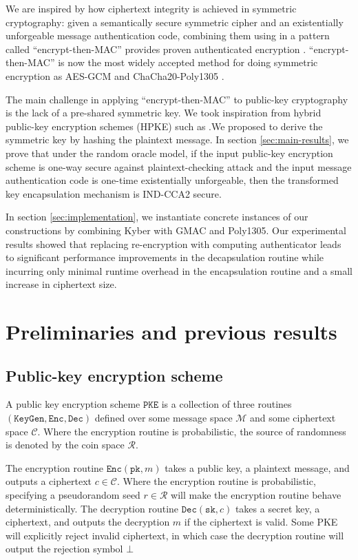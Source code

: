 \documentclass[journal=tches,submission]{iacrtrans}
\newcommand{\pke}{\texttt{PKE}}
\newcommand{\keygen}{\texttt{KeyGen}}
\newcommand{\encrypt}{\texttt{Enc}}
\newcommand{\decrypt}{\texttt{Dec}}
\newcommand{\pk}{\texttt{pk}}
\newcommand{\sk}{\texttt{sk}}
\begin{document}
We are inspired by how ciphertext integrity is achieved in symmetric cryptography: given a semantically secure symmetric cipher and an existentially unforgeable message authentication code, combining them using in a pattern called ``encrypt-then-MAC'' provides proven authenticated encryption \cite{bellare2000authenticated}. ``encrypt-then-MAC'' is now the most widely accepted method for doing symmetric encryption as AES-GCM \cite{mcgrew2004galois} and ChaCha20-Poly1305 \cite{nir2018chacha20}.

The main challenge in applying ``encrypt-then-MAC'' to public-key cryptography is the lack of a pre-shared symmetric key. We took inspiration from hybrid public-key encryption schemes (HPKE) such as .We proposed to derive the symmetric key by hashing the plaintext message. In section \ref{sec:main-results}, we prove that under the random oracle model, if the input public-key encryption scheme is one-way secure against plaintext-checking attack and the input message authentication code is one-time existentially unforgeable, then the transformed key encapsulation mechanism is IND-CCA2 secure.

In section \ref{sec:implementation}, we instantiate concrete instances of our constructions by combining Kyber with GMAC and Poly1305. Our experimental results showed that replacing re-encryption with computing authenticator leads to significant performance improvements in the decapsulation routine while incurring only minimal runtime overhead in the encapsulation routine and a small increase in ciphertext size.

\section{Preliminaries and previous results}

\subsection{Public-key encryption scheme}
A public key encryption scheme $\pke$ is a collection of three routines $(\keygen, \encrypt, \decrypt)$ defined over some message space $\mathcal{M}$ and some ciphertext space $\mathcal{C}$. Where the encryption routine is probabilistic, the source of randomness is denoted by the coin space $\mathcal{R}$.

The encryption routine $\encrypt(\pk, m)$ takes a public key, a plaintext message, and outputs a ciphertext $c \in \mathcal{C}$. Where the encryption routine is probabilistic, specifying a pseudorandom seed $r \in \mathcal{R}$ will make the encryption routine behave deterministically. The decryption routine $\decrypt(\sk, c)$ takes a secret key, a ciphertext, and outputs the decryption $\hat{m}$ if the ciphertext is valid. Some PKE will explicitly reject invalid ciphertext, in which case the decryption routine will output the rejection symbol $\bot$
\end{document}
